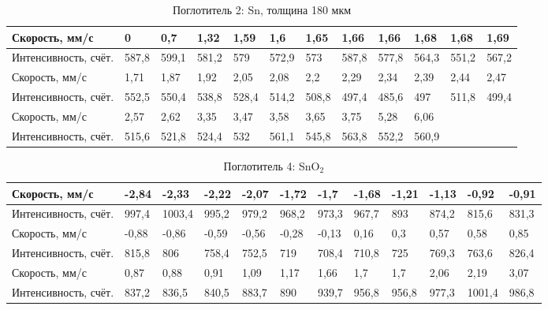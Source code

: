 \documentclass[a4paper]{article}
\begin{document}
\begin{enumerate}
\begin{table}[h]
    \centering
    \begin{center}
    \caption{Поглотитель 2: Sn, толщина 180 мкм}
    \end{center}
    \vspace{0.1cm}
    \label{tab:my_label}
    \begin{tabular}{ |p{2.5cm}||p{1cm}|p{1cm}|p{1cm}|p{1cm}|p{1cm}|p{1cm}|p{1cm}|p{1cm}|p{1cm}|p{1cm}|p{1cm}|}
 \hline
 Скорость, мм/с & 0 & 0,7 & 1,32 & 1,59 & 1,6 & 1,65 & 1,66 & 1,66 & 1,68 & 1,68 & 1,69
 \\
\hline
 Интенсивность, счёт. & 587,8 & 599,1 & 581,2 & 579 & 572,9 & 573 & 587,8 & 577,8 & 564,3 & 551,2 & 567,2
\\
\hline
\hline
Скорость, мм/с & 1,71 & 1,87 & 1,92 & 2,05 & 2,08 & 2,2 & 2,29 & 2,34 & 2,39 & 2,44 & 2,47
 \\
 \hline
 Интенсивность, счёт.  & 552,5 & 550,4 & 538,8 & 528,4 & 514,2 & 508,8 & 497,4 & 485,6 & 497 & 511,8 & 499,4
\\
 \hline
 \hline
Скорость, мм/с & 2,57 & 2,62 & 3,35 & 3,47 & 3,58 & 3,65 & 3,75 & 5,28 & 6,06 & & 

 \\
 \hline
 Интенсивность, счёт.  & 515,6 & 521,8 & 524,4 & 532 & 561,1 & 545,8 & 563,8 & 552,2 & 560,9 & & 
\\
 \hline
\end{tabular}
\end{table}

\begin{table}[h]
    \centering
    \begin{center}
    \caption{Поглотитель 4: SnO$_2$}
    \end{center}
    \vspace{0.1cm}
    \label{tab:my_label}
    \begin{tabular}{ |p{2.5cm}||p{1cm}|p{1cm}|p{1cm}|p{1cm}|p{1cm}|p{1cm}|p{1cm}|p{1cm}|p{1cm}|p{1cm}|p{1cm}|}
 \hline
 Скорость, мм/с & -2,84 & -2,33 & -2,22 & -2,07 & -1,72 & -1,7 & -1,68 & -1,21 & -1,13 & -0,92 & -0,91
 \\
\hline
 Интенсивность, счёт. & 997,4 & 1003,4 & 995,2 & 979,2 & 968,2 & 973,3 & 967,7 & 893 & 874,2 & 815,6 & 831,3
\\
\hline
\hline
Скорость, мм/с & -0,88 & -0,86 & -0,59 & -0,56 & -0,28 & -0,13 & 0,16 & 0,3 & 0,57 & 0,58 & 0,85
\\
 \hline
 Интенсивность, счёт.  & 815,8 & 806 & 758,4 & 752,5 & 719 & 708,4 & 710,8 & 725 & 769,3 & 763,6 & 826,4
\\
 \hline
 \hline
Скорость, мм/с & 0,87 & 0,88 & 0,91 & 1,09 & 1,17 & 1,66 & 1,7 & 1,7 & 2,06 & 2,19 & 3,07
\\
 \hline
 Интенсивность, счёт.  & 837,2 & 836,5 & 840,5 & 883,7 & 890 & 939,7 & 956,8 & 956,8 & 977,3 & 1001,4 & 986,8
 \\
 \hline
\end{tabular}
\end{table}


\end{enumerate}
\end{document}
